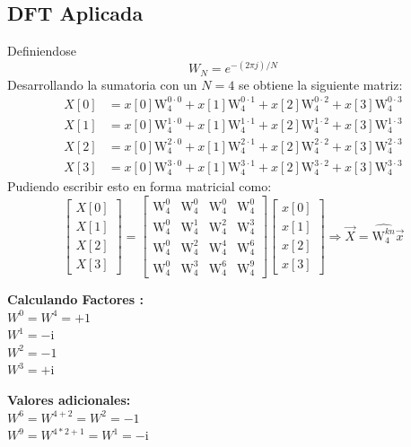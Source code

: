 \documentclass[12pt]{article}
\begin{document}
\subsection{DFT Aplicada}
Definiendose $$
W_N = e^{-(2\pi j) / N}
$$
Desarrollando la sumatoria con un $N=4$ se obtiene la siguiente matriz:
$$
\begin{aligned}
    X[0] &= x[0] \text{W}_4^{0\cdot0} + x[1] \text{W}_4^{0\cdot1} + x[2] \text{W}_4^{0\cdot2} + x[3] \text{W}_4^{0\cdot3} \\
    X[1] &= x[0] \text{W}_4^{1\cdot0} + x[1] \text{W}_4^{1\cdot1} + x[2] \text{W}_4^{1\cdot2} + x[3] \text{W}_4^{1\cdot3} \\    
    X[2] &= x[0] \text{W}_4^{2\cdot0} + x[1] \text{W}_4^{2\cdot1} + x[2] \text{W}_4^{2\cdot2} + x[3] \text{W}_4^{2\cdot3} \\
    X[3] &= x[0] \text{W}_4^{3\cdot0} + x[1] \text{W}_4^{3\cdot1} + x[2] \text{W}_4^{3\cdot2} + x[3] \text{W}_4^{3\cdot3}
\end{aligned}
$$
Pudiendo escribir esto en forma matricial como:
$$
\begin{bmatrix}
X[0] \\
X[1] \\
X[2] \\
X[3]
\end{bmatrix}
=
\begin{bmatrix}       
\text{W}_4^{0} & \text{W}_4^{0} & \text{W}_4^{0} & \text{W}_4^{0} \\
\text{W}_4^{0} & \text{W}_4^{1} & \text{W}_4^{2} & \text{W}_4^{3} \\
\text{W}_4^{0} & \text{W}_4^{2} & \text{W}_4^{4} & \text{W}_4^{6} \\
\text{W}_4^{0} & \text{W}_4^{3} & \text{W}_4^{6} & \text{W}_4^{9}
\end{bmatrix}
\begin{bmatrix}
x[0] \\
x[1] \\
x[2] \\
x[3]
\end{bmatrix}
\Rightarrow \vec{X}=\widehat{\text{W}^{kn}_4} \vec{x}
$$
\noindent
\begin{minipage}[t]{0.4\textwidth}
    \textbf{Calculando Factores :} \\[0.2cm]
    $W^0 = W^4 = +1$ \\
    $W^1 = -\text{i}$ \\
    $W^2 = -1$ \\
    $W^3 = +\text{i}$ \\

\end{minipage}
\begin{minipage}[t]{0.4\textwidth}
    \textbf{Valores adicionales:} \\[0.2cm]
    $W^6 = W^{4+2} = W^2 = -1$ \\
    $W^9 = W^{4*2+1}=W^1 = -\text{i}$
\end{minipage}
\end{document}
